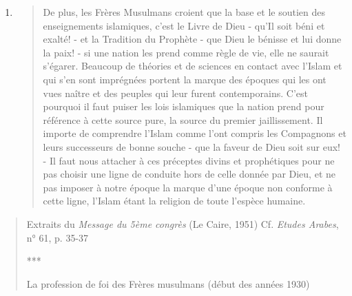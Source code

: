 \begin{enumerate}
\def\labelenumi{\arabic{enumi}.}
\setcounter{enumi}{1}
\item
  \begin{quote}
  De plus, les Frères Musulmans croient que la base et le soutien des
  enseignements islamiques, c'est le Livre de Dieu - qu'Il soit béni et
  exalté! - et la Tradition du Prophète - que Dieu le bénisse et lui
  donne la paix! - si une nation les prend comme règle de vie, elle ne
  saurait s'égarer. Beaucoup de théories et de sciences en contact avec
  l'Islam et qui s'en sont imprégnées portent la marque des époques qui
  les ont vues naître et des peuples qui leur furent contemporains.
  C'est pourquoi il faut puiser les lois islamiques que la nation prend
  pour référence à cette source pure, la source du premier
  jaillissement. Il importe de comprendre l'Islam comme l'ont compris
  les Compagnons et leurs successeurs de bonne souche - que la faveur de
  Dieu soit sur eux! - Il faut nous attacher à ces préceptes divins et
  prophétiques pour ne pas choisir une ligne de conduite hors de celle
  donnée par Dieu, et ne pas imposer à notre époque la marque d'une
  époque non conforme à cette ligne, l'Islam étant la religion de toute
  l'espèce humaine.
  \end{quote}
\end{enumerate}

\begin{quote}
Extraits du \emph{Message du 5ème congrès} (Le Caire, 1951) Cf.
\emph{Etudes Arabes}, n° 61, p. 35-37

***

La profession de foi des Frères musulmans (début des années 1930)
\end{quote}

